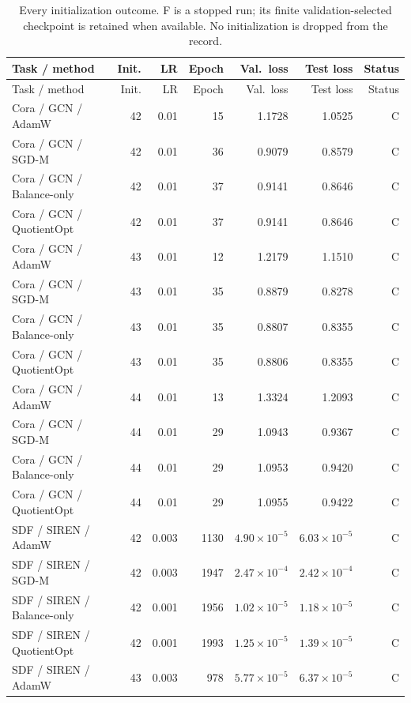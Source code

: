 \begin{longtable}{p{.31\linewidth}rrrrrr}
\caption{Every initialization outcome. F is a stopped run; its finite validation-selected checkpoint is retained when available. No initialization is dropped from the record.}\label{tab:initialization-all}\\
\toprule Task / method & Init. & LR & Epoch & Val.\ loss & Test loss & Status\\\midrule\endfirsthead
\toprule Task / method & Init. & LR & Epoch & Val.\ loss & Test loss & Status\\\midrule\endhead
Cora / GCN / AdamW & 42 & 0.01 & 15 & 1.1728 & 1.0525 & C\\
Cora / GCN / SGD-M & 42 & 0.01 & 36 & 0.9079 & 0.8579 & C\\
Cora / GCN / Balance-only & 42 & 0.01 & 37 & 0.9141 & 0.8646 & C\\
\rowcolor{oursbg}Cora / GCN / QuotientOpt & 42 & 0.01 & 37 & 0.9141 & 0.8646 & C\\
Cora / GCN / AdamW & 43 & 0.01 & 12 & 1.2179 & 1.1510 & C\\
Cora / GCN / SGD-M & 43 & 0.01 & 35 & 0.8879 & 0.8278 & C\\
Cora / GCN / Balance-only & 43 & 0.01 & 35 & 0.8807 & 0.8355 & C\\
\rowcolor{oursbg}Cora / GCN / QuotientOpt & 43 & 0.01 & 35 & 0.8806 & 0.8355 & C\\
Cora / GCN / AdamW & 44 & 0.01 & 13 & 1.3324 & 1.2093 & C\\
Cora / GCN / SGD-M & 44 & 0.01 & 29 & 1.0943 & 0.9367 & C\\
Cora / GCN / Balance-only & 44 & 0.01 & 29 & 1.0953 & 0.9420 & C\\
\rowcolor{oursbg}Cora / GCN / QuotientOpt & 44 & 0.01 & 29 & 1.0955 & 0.9422 & C\\
SDF / SIREN / AdamW & 42 & 0.003 & 1130 & $4.90\!\times\!10^{-5}$ & $6.03\!\times\!10^{-5}$ & C\\
SDF / SIREN / SGD-M & 42 & 0.003 & 1947 & $2.47\!\times\!10^{-4}$ & $2.42\!\times\!10^{-4}$ & C\\
SDF / SIREN / Balance-only & 42 & 0.001 & 1956 & $1.02\!\times\!10^{-5}$ & $1.18\!\times\!10^{-5}$ & C\\
\rowcolor{oursbg}SDF / SIREN / QuotientOpt & 42 & 0.001 & 1993 & $1.25\!\times\!10^{-5}$ & $1.39\!\times\!10^{-5}$ & C\\
SDF / SIREN / AdamW & 43 & 0.003 & 978 & $5.77\!\times\!10^{-5}$ & $6.37\!\times\!10^{-5}$ & C\\

\end{longtable}

